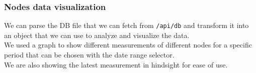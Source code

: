 \subsubsection{Nodes data visualization}
We can parse the DB file that we can fetch from \verb|/api/db| and transform it into an object that we can use to analyze and visualize the data. \\
We used a graph to show different measurements of different nodes for a specific period that can be chosen with the date range selector. \\
We are also showing the latest measurement in hindsight for ease of use.